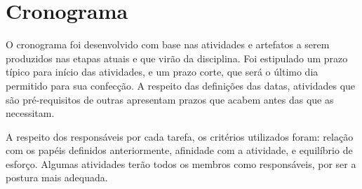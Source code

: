 \section{Cronograma}

O cronograma foi desenvolvido com base nas atividades e artefatos a serem produzidos nas etapas atuais e que virão da disciplina. Foi estipulado um prazo típico para início das atividades, e um prazo corte, que será o último dia permitido para sua confecção. A respeito das definições das datas, atividades que são pré-requisitos de outras apresentam prazos que acabem antes das que as necessitam.

A respeito dos responsáveis por cada tarefa, os critérios utilizados foram: relação com os papéis definidos anteriormente, afinidade com a atividade, e equilíbrio de esforço. Algumas atividades terão todos os membros como responsáveis, por ser a postura mais adequada.

